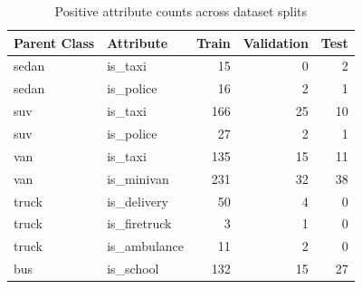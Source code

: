 \begin{table}[!htbp]
    \centering
    \caption{Positive attribute counts across dataset splits}
    \label{tab:split_attribute_counts}
    \begin{tabular}{llrrr}
        \toprule
        \textbf{Parent Class} & \textbf{Attribute} & \textbf{Train} & \textbf{Validation} & \textbf{Test} \\
        \midrule
        sedan & is\_taxi         & 15  & 0  & 2  \\
        sedan & is\_police       & 16  & 2  & 1  \\
        \midrule
        suv   & is\_taxi         & 166 & 25 & 10 \\
        suv   & is\_police       & 27  & 2  & 1  \\
        \midrule
        van   & is\_taxi         & 135 & 15 & 11 \\
        van   & is\_minivan      & 231 & 32 & 38 \\
        \midrule
        truck & is\_delivery     & 50  & 4  & 0  \\
        truck & is\_firetruck    & 3   & 1  & 0  \\
        truck & is\_ambulance    & 11  & 2  & 0  \\
        \midrule
        bus   & is\_school       & 132 & 15 & 27 \\
        \bottomrule
    \end{tabular}
\end{table}

\FloatBarrier
